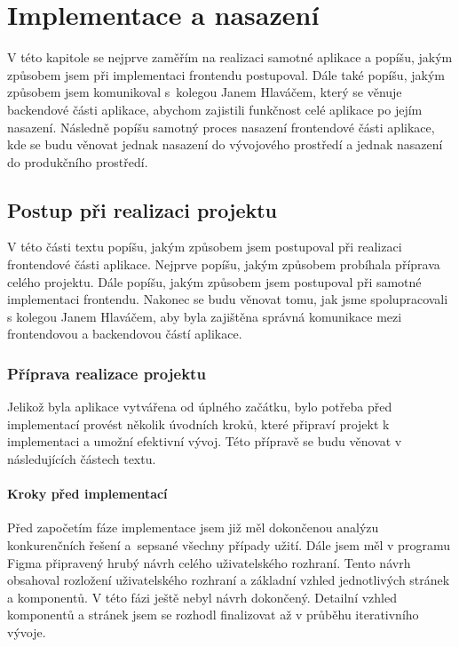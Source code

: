 \chapter{Implementace a nasazení}

V této kapitole se nejprve zaměřím na realizaci samotné aplikace a popíšu, jakým způsobem jsem při implementaci frontendu postupoval. Dále také popíšu, jakým způsobem jsem komunikoval s~kolegou Janem Hlaváčem, který se věnuje backendové části aplikace, abychom zajistili funkčnost celé aplikace po jejím nasazení. Následně popíšu samotný proces nasazení frontendové části aplikace, kde se budu věnovat jednak nasazení do vývojového prostředí a jednak nasazení do produkčního prostředí.

\section{Postup při realizaci projektu}

V této části textu popíšu, jakým způsobem jsem postupoval při realizaci frontendové části aplikace. Nejprve popíšu, jakým způsobem probíhala příprava celého projektu. Dále popíšu, jakým způsobem jsem postupoval při samotné implementaci frontendu. Nakonec se budu věnovat tomu, jak jsme spolupracovali s kolegou Janem Hlaváčem, aby byla zajištěna správná komunikace mezi frontendovou a backendovou částí aplikace.

\subsection{Příprava realizace projektu}

Jelikož byla aplikace vytvářena od úplného začátku, bylo potřeba před implementací provést několik úvodních kroků, které připraví projekt k implementaci a umožní efektivní vývoj. Této přípravě se budu věnovat v následujících částech textu.

\subsubsection{Kroky před implementací}

Před započetím fáze implementace jsem již měl dokončenou analýzu konkurenčních řešení a~sepsané všechny případy užití. Dále jsem měl v programu Figma připravený hrubý návrh celého uživatelského rozhraní. Tento návrh obsahoval rozložení uživatelského rozhraní a základní vzhled jednotlivých stránek a komponentů. V této fázi ještě nebyl návrh dokončený. Detailní vzhled komponentů a stránek jsem se rozhodl finalizovat až v průběhu iterativního vývoje. 

